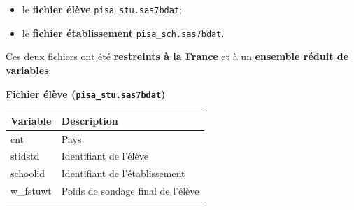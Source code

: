 \documentclass[12pt,twosided, notitlepage]{book}
\providecommand{\tightlist}{%
  \setlength{\itemsep}{0pt}\setlength{\parskip}{0pt}}
\begin{document}
\begin{itemize}
\tightlist
\item
  le \textbf{fichier élève} \texttt{pisa\_stu.sas7bdat};
\item
  le \textbf{fichier établissement} \texttt{pisa\_sch.sas7bdat}.
\end{itemize}

Ces deux fichiers ont été \textbf{restreints à la France} et à un
\textbf{ensemble réduit de variables}:

\textbf{Fichier élève (\texttt{pisa\_stu.sas7bdat})}

\begin{longtable}[]{@{}ll@{}}
\toprule
\begin{minipage}[b]{0.38\columnwidth}\raggedright\strut
\textbf{Variable}\strut
\end{minipage} & \begin{minipage}[b]{0.55\columnwidth}\raggedright\strut
\textbf{Description}\strut
\end{minipage}\tabularnewline
\midrule
\endhead
\begin{minipage}[t]{0.38\columnwidth}\raggedright\strut
cnt\strut
\end{minipage} & \begin{minipage}[t]{0.55\columnwidth}\raggedright\strut
Pays\strut
\end{minipage}\tabularnewline
\begin{minipage}[t]{0.38\columnwidth}\raggedright\strut
stidstd\strut
\end{minipage} & \begin{minipage}[t]{0.55\columnwidth}\raggedright\strut
Identifiant de l'élève\strut
\end{minipage}\tabularnewline
\begin{minipage}[t]{0.38\columnwidth}\raggedright\strut
schoolid\strut
\end{minipage} & \begin{minipage}[t]{0.55\columnwidth}\raggedright\strut
Identifiant de l'établissement\strut
\end{minipage}\tabularnewline
\begin{minipage}[t]{0.38\columnwidth}\raggedright\strut
w\_fstuwt\strut
\end{minipage} & \begin{minipage}[t]{0.55\columnwidth}\raggedright\strut
Poids de sondage final de l'élève\strut
\end{minipage}\tabularnewline
\begin{minipage}[t]{0.38\columnwidth}\raggedright\strut

\end{minipage}
\end{longtable}
\end{document}
